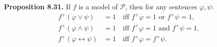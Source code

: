 \textbf{Proposition 8.31.} If $f$ is a model of $\mathcal{P}$, then for any sentences $\varphi, \psi$:
\begin{align*}
f^+(\varphi \lor \psi) &= 1 \quad \text{iff } f^+\varphi = 1 \text{ or } f^+\psi = 1,\\
f^+(\varphi \land \psi) &= 1 \quad \text{iff } f^+\varphi = 1 \text{ and } f^+\psi = 1,\\
f^+(\varphi \leftrightarrow \psi) &= 1 \quad \text{iff } f^+\varphi = f^+\psi.
\end{align*}
